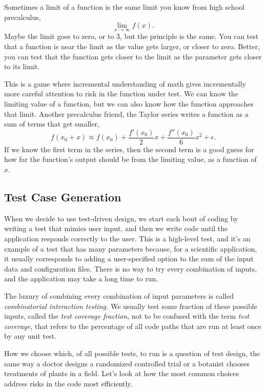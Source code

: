 \documentclass[fleqn,10pt]{olplainarticle}
\begin{document}
Sometimes a limit of a function is the same limit you know
from high school precalculus,
\begin{equation}
  \lim_{x\rightarrow\infty} f(x).
\end{equation}
Maybe the limit goes to zero, or to 3, but the principle is
the same. You can test that a function is near the limit
as the value gets larger, or closer to zero. Better, you can
test that the function gets closer to the limit as the
parameter gets closer to its limit.

This is a game where incremental understanding of math
gives incrementally more careful attention to risk in the
function under test. We can know the limiting value of a
function, but we can also know how the function approaches
that limit. Another precalculus friend, the Taylor series
writes a function as a sum of terms that get smaller,
\begin{equation}
  f(x_0+x) \approx f(x_0) + \frac{f'(x_0)}{2}x + \frac{f''(x_0)}{6}x^2 + \epsilon.
\end{equation}
If we know the first term in the series, then the second term
is a good guess for how far the function's output should be from
the limiting value, as a function of $x$.


\subsection{Test Case Generation}
When we decide to use test-driven design, we start each bout of
coding by writing a test that mimics user input, and then we write
code until the application responds correctly to the user.
This is a high-level test, and it's an example of a test that
has many parameters because, for a scientific application, it
usually corresponds to adding a user-specified option to the
sum of the input data and configuration files. There is no
way to try every combination of inputs, and the application
may take a long time to run.

The luxury of combining every combination of input parameters
is called \emph{combinatorial interaction testing.} We usually
test some fraction of these possible inputs, called the
\emph{test coverage fraction,} not to be confused with the
term \emph{test coverage,} that refers to the percentage of
all code paths that are run at least once by any unit test.

How we choose which, of all possible tests, to run is a question
of test design, the same way a doctor designs a randomized
controlled trial or a botanist chooses treatments of plants
in a field. Let's look at how the most common choices
address risks in the code most efficiently.
\end{document}

